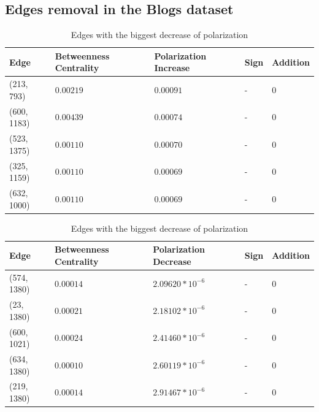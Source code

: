 \begin{table}[H]
\subsection{Edges removal in the Blogs dataset}

\begin{table}[H]
 \centering
 \caption{Edges with the biggest increase of polarization}
 \label{tab:edgesLargest}
 \begin{tabular}{| l || l | l | l | l |}
 \hline
  Edge & Betweenness Centrality & Polarization Increase & Sign & Addition\\
  \hline
  \hline
  (213, 793) & $0.00219$ & $0.00091$ & - &  0\\
  \hline
  (600, 1183) & $0.00439$ & $0.00074$ & - &  0\\
  \hline
  (523, 1375) & $0.00110$ & $0.00070$ & - &  0\\
  \hline
  (325, 1159) & $0.00110$ & $0.00069$ & - &  0\\
  \hline
  (632, 1000) & $0.00110$ & $0.00069$ & - &  0\\
  \hline
 \end{tabular}
 
 
 \caption{Edges with the biggest decrease of polarization }
 \label{tab:edgesLargest}
 \begin{tabular}{| l || l | l | l | l |}
 \hline
  Edge & Betweenness Centrality & Polarization Decrease & Sign & Addition\\
  \hline
  \hline
  (574, 1380) & $0.00014$ & $2.09620*10^{-6}$ & - &  0\\
  \hline
  (23, 1380) & $0.00021$ & $2.18102*10^{-6}$ & - &  0\\
  \hline
  (600, 1021) & $0.00024$ & $2.41460*10^{-6}$ & - &  0\\
  \hline
  (634, 1380) & $0.00010$ & $2.60119*10^{-6}$ & - &  0\\
  \hline
  (219, 1380) & $0.00014$ & $2.91467*10^{-6}$ & - &  0\\
  \hline
  \hline
 \end{tabular}
 
\end{table}


\end{table}
